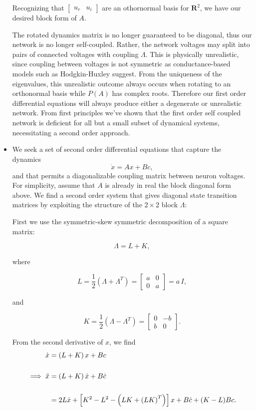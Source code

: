 \begin{itemize}
Recognizing that $\begin{bmatrix}
u_r & u_i
\end{bmatrix}$ are an othornormal basis for $\mathbf{R}^2$, we have our desired block form of $A$.

 The rotated dynamics matrix is no longer guaranteed to be diagonal, thus our network is no longer self-coupled. Rather, the network voltages may split into pairs of connected voltages with coupling $\Lambda$. This is physically unrealistic, since coupling between voltages is not symmetric as conductance-based models such as Hodgkin-Huxley suggest. From the uniqueness of the eigenvalues, this unrealistic outcome always occurs when rotating to an orthonormal basis  while $P(A)$ has complex roots. Therefore our first order differential equations will always produce either a degenerate or unrealistic network. From first principles we've shown that the first order self coupled network is deficient for all but a small subset of dynamical systems, necessitating a second order approach.
\\


\item We seek a set of second order differential equations that capture the dynamics
$$
\dot{x} = Ax + B c,
$$
and that permits a diagonalizable coupling matrix between neuron voltages. For simplicity, assume that $A$ is already in real the block diagonal form above. We find a second order system that gives diagonal state transition matrices by exploiting the structure of the $2 \times 2$ block $\Lambda$: 


First we use the symmetric-skew symmetric decomposition of a square matrix:

$$
\Lambda = L + K,
$$

where 

$$
L =  \frac{1}{2}\left(\Lambda + \Lambda^T\right)  =\begin{bmatrix}
a & 0
\\
0 & a
\end{bmatrix} = a\, I,
$$

and

$$
K =  \frac{1}{2}\left(\Lambda - \Lambda^T\right) = \begin{bmatrix}
0 & -b
\\
b & 0
\end{bmatrix}.
$$


From the second derivative of $x$, we find
\begin{align*}
\dot{x} &= \left(L + K\right)x  + Bc\notag
\\
\notag
\\
\implies
\ddot{x}
&= 
\left(L + K\right) \dot{x} + B\dot{c}
\\
\\
&=
2 L \dot{x} + \left[ K^2 - L^2 - \left(LK + \left(LK\right)^T\right)\right]x + B\dot{c} + (K - L)Bc.
\end{align*}


\end{itemize}
